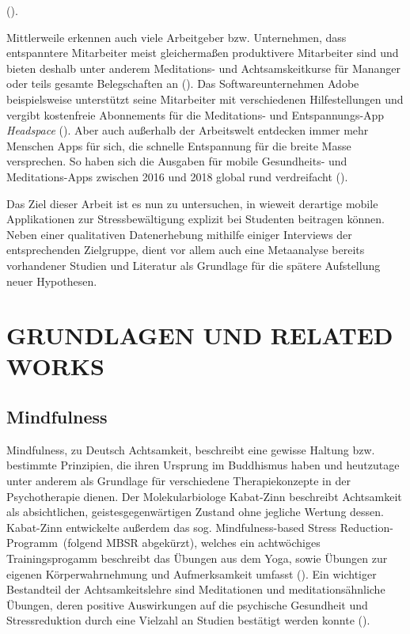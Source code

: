 \documentclass[10pt]{article}
\newcommand{\zit}[1]{(\cite{#1})}
\begin{document}
\zit{Stressbewältigung}.

Mittlerweile erkennen auch viele Arbeitgeber bzw. Unternehmen, dass entspanntere Mitarbeiter meist gleichermaßen produktivere Mitarbeiter sind und bieten deshalb unter anderem Meditations- und Achtsamskeitkurse für Mananger oder teils gesamte Belegschaften an \zit{Handelsblatt}. Das Softwareunternehmen Adobe beispielsweise unterstützt seine Mitarbeiter mit verschiedenen Hilfestellungen und vergibt kostenfreie Abonnements für die Meditations- und Entspannungs-App \textit{Headspace} \zit{Adobe}. 
Aber auch außerhalb der Arbeitswelt entdecken immer mehr Menschen Apps für sich, die schnelle Entspannung für die breite Masse versprechen. So haben sich die Ausgaben für mobile Gesundheits- und Meditations-Apps zwischen 2016 und 2018 global rund verdreifacht \zit{SteigendeNutzung}.

Das Ziel dieser Arbeit ist es nun zu untersuchen, in wieweit derartige mobile Applikationen zur Stressbewältigung explizit bei Studenten beitragen können.
Neben einer qualitativen Datenerhebung mithilfe einiger Interviews der entsprechenden Zielgruppe, dient vor allem auch eine Metaanalyse bereits vorhandener Studien und Literatur als Grundlage für die spätere Aufstellung neuer Hypothesen.
\bigbreak


\section{GRUNDLAGEN UND RELATED WORKS}

\subsection{Mindfulness}
Mindfulness, zu Deutsch Achtsamkeit, beschreibt eine gewisse Haltung bzw. bestimmte Prinzipien, die ihren Ursprung im Buddhismus haben und heutzutage unter anderem als Grundlage für verschiedene Therapiekonzepte in der Psychotherapie dienen. Der Molekularbiologe Kabat-Zinn beschreibt Achtsamkeit als absichtlichen, geistesgegenwärtigen Zustand ohne jegliche Wertung dessen. Kabat-Zinn entwickelte außerdem das sog. \grqq Mindfulness-based Stress Reduction-Programm\grqq\ (folgend MBSR abgekürzt), welches ein achtwöchiges Trainingsprogamm beschreibt das Übungen aus dem Yoga, sowie Übungen zur eigenen Körperwahrnehmung und Aufmerksamkeit umfasst \zit{AchtsamkeitBasics}. Ein wichtiger Bestandteil der Achtsamkeitslehre sind Meditationen und meditationsähnliche Übungen, deren positive Auswirkungen auf die psychische Gesundheit und Stressreduktion durch eine Vielzahl an Studien bestätigt werden konnte \zit{MindfulnessStudy2}.
\end{document}
